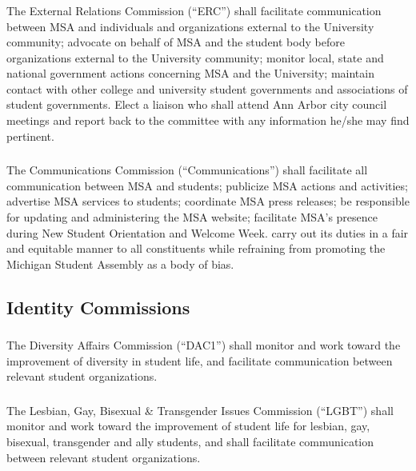 \subsubsection{}
The External Relations Commission (``ERC'') shall
\subsubsubsection{}
facilitate communication between MSA and individuals and organizations external to the University community;
\subsubsubsection{}
advocate on behalf of MSA and the student body before organizations external to the University community;
\subsubsubsection{}
monitor local, state and national government actions concerning MSA and the University;
\subsubsubsection{}
maintain contact with other college and university student governments and associations of student governments.
\subsubsubsection{}
Elect a liaison who shall attend Ann Arbor city council meetings and report back to the committee with any information he/she may find pertinent.

\subsubsection{}
The Communications Commission (``Communications'') shall
\subsubsubsection{}
facilitate all communication between MSA and students;
\subsubsubsection{}
publicize MSA actions and activities;
\subsubsubsection{}
advertise MSA services to students;
\subsubsubsection{}
coordinate MSA press releases;
\subsubsubsection{}
be responsible for updating and administering the MSA website;
\subsubsubsection{}
facilitate MSA's presence during New Student Orientation and Welcome Week.
\subsubsubsection{}
carry out its duties in a fair and equitable manner to all constituents while refraining from promoting the Michigan Student Assembly as a body of bias.


\subsection{Identity Commissions}

\subsubsection{}
The Diversity Affairs Commission (``DAC1'') shall monitor and work toward the improvement of diversity in student life, and facilitate communication between relevant student organizations.

\subsubsection{}
The Lesbian, Gay, Bisexual \& Transgender Issues Commission (``LGBT'') shall monitor and work toward the improvement of student life for lesbian, gay, bisexual, transgender and ally students, and shall facilitate communication between relevant student organizations.

